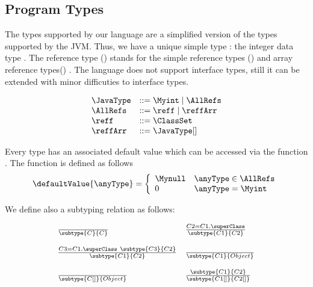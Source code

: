 
\subsection{Program Types}\label{types}
 The types supported by our language are a simplified version
 of the types supported by the JVM.
 Thus, we have a unique simple type : the integer data type \Myint.
 The reference type (\AllRefs) stands for the simple reference types ()
 and array reference types( ) .
 The language does not support interface types, still it can be extended 
 with minor difficuties to interface types. 

  

$$ \begin{array}{ll}
          \JavaType & ::= \Myint \mid \AllRefs\\
          \AllRefs  & ::= \reff \mid \reffArr \\
	  \reff     & ::= \ClassSet \\
	  \reffArr  & ::= \JavaType[]	  
   \end{array}  $$


Every type has an associated default value which can be accessed via
the function . The function is defined as follows
$$ \defaultValue{\anyType} = 
           \left\{\begin{array}{ll}
	      \Mynull & \anyType \in \AllRefs \\
	       0 &  \anyType = \Myint
	    \end{array}\right. $$

We define also a subtyping relation as follows:

$$\begin{array}{ll}
  \frac{}{ \subtype{C}{C}} &  
  \frac{   C2 = C1.\superClass  }{\subtype{C1}{C2}} \\  
  & \\
  \frac{ C3 = C1.\superClass \   \subtype{C3}{C2} }{ \subtype{C1}{C2} } &
  \frac{}{  \subtype{C1}{Object}} \\
  & \\
  \frac{   }{\subtype{C[]}{Object}} &  
  \frac{ \subtype{C1}{C2}}{\subtype{C1[]}{C2[]}} \\
  \end{array}$$
